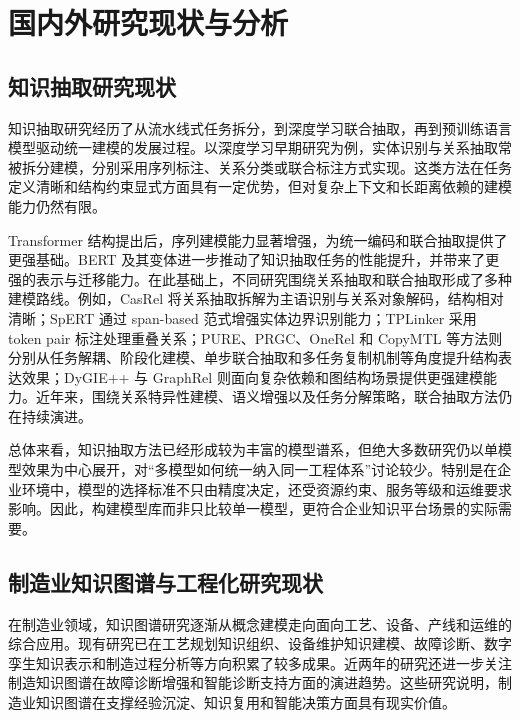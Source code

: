 \section{国内外研究现状与分析}
\subsection{知识抽取研究现状}
知识抽取研究经历了从流水线式任务拆分，到深度学习联合抽取，再到预训练语言模型驱动统一建模的发展过程\cite{resurvey2023,lmdsurvey2025}。以深度学习早期研究为例，实体识别与关系抽取常被拆分建模，分别采用序列标注、关系分类或联合标注方式实现\cite{lample2016,mahovy2016,chiu2016,miwabansal2016,zheng2017}。这类方法在任务定义清晰和结构约束显式方面具有一定优势，但对复杂上下文和长距离依赖的建模能力仍然有限。

Transformer 结构提出后，序列建模能力显著增强，为统一编码和联合抽取提供了更强基础\cite{vaswani2017}。BERT 及其变体进一步推动了知识抽取任务的性能提升，并带来了更强的表示与迁移能力\cite{bert2019,spanbert2020,tinybert2020}。在此基础上，不同研究围绕关系抽取和联合抽取形成了多种建模路线。例如，CasRel 将关系抽取拆解为主语识别与关系对象解码，结构相对清晰；SpERT 通过 span-based 范式增强实体边界识别能力；TPLinker 采用 token pair 标注处理重叠关系；PURE、PRGC、OneRel 和 CopyMTL 等方法则分别从任务解耦、阶段化建模、单步联合抽取和多任务复制机制等角度提升结构表达效果；DyGIE++ 与 GraphRel 则面向复杂依赖和图结构场景提供更强建模能力\cite{casrel2020,spert2019,tplinker2020,pure2021,prgc2021,onerel2022,copymtl2020,dygiepp2019,graphrel2019}。近年来，围绕关系特异性建模、语义增强以及任务分解策略，联合抽取方法仍在持续演进\cite{rsan2020,einet2022,decompose2024,mfie2024,singletable2024}。

总体来看，知识抽取方法已经形成较为丰富的模型谱系，但绝大多数研究仍以单模型效果为中心展开，对“多模型如何统一纳入同一工程体系”讨论较少。特别是在企业环境中，模型的选择标准不只由精度决定，还受资源约束、服务等级和运维要求影响。因此，构建模型库而非只比较单一模型，更符合企业知识平台场景的实际需要。

\subsection{制造业知识图谱与工程化研究现状}
在制造业领域，知识图谱研究逐渐从概念建模走向面向工艺、设备、产线和运维的综合应用。现有研究已在工艺规划知识组织、设备维护知识建模、故障诊断、数字孪生知识表示和制造过程分析等方向积累了较多成果\cite{processkgmethods2023,maintenancekg2023,faultkg2024,digitaltwinkg2024,prodlinekg2025,dtsystemkg2025}。近两年的研究还进一步关注制造知识图谱在故障诊断增强和智能诊断支持方面的演进趋势\cite{sensorkgicl2024,robotkg2025}。这些研究说明，制造业知识图谱在支撑经验沉淀、知识复用和智能决策方面具有现实价值。

